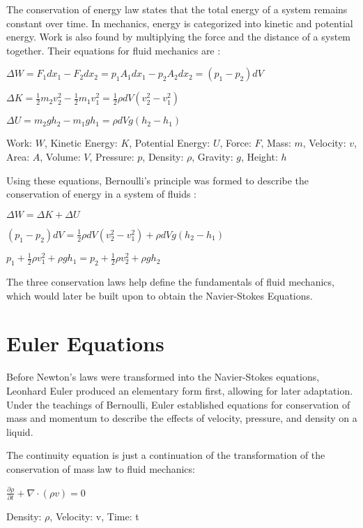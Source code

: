 \documentclass[12pt]{article}
\begin{document}
The conservation of energy law states that the total energy of a system remains constant over time. In mechanics, energy is categorized into kinetic and potential energy. Work is also found by multiplying the force and the distance of a system together. Their equations for fluid mechanics are \cite{Energy}: 
\begin{center}$\Delta W = F_1dx_1-F_2dx_2=p_1A_1dx_1-p_2A_2dx_2=(p_1-p_2)dV$\end{center}
\begin{center}$\Delta K = \frac{1}{2}m_2v_2^2-\frac{1}{2}m_1v_1^2 = \frac{1}{2}\rho dV(v_2^2-v_1^2)$\end{center}
\begin{center}$\Delta U = m_2gh_2-m_1gh_1 = \rho dVg(h_2-h_1)$\end{center}
\begin{center}Work: $W$, Kinetic Energy: $K$, Potential Energy: $U$, Force: $F$, Mass: $m$, Velocity: $v$, Area: $A$, Volume: $V$, Pressure: $p$, Density: $\rho$, Gravity: $g$, Height: $h$\end{center}

Using these equations, Bernoulli's principle was formed to describe the conservation of energy in a system of fluids \cite{Bernoulli}:
\begin{center}$\Delta W = \Delta K + \Delta U$\end{center}
\begin{center}$(p_1-p_2)dV = \frac{1}{2}\rho dV(v_2^2-v_1^2) + \rho dVg(h_2-h_1)$\end{center}
\begin{center}$p_1+\frac{1}{2}\rho v_1^2 + \rho gh_1 = p_2+\frac{1}{2}\rho v_2^2 + \rho gh_2$\end{center}

The three conservation laws help define the fundamentals of fluid mechanics, which would later be built upon to obtain the Navier-Stokes Equations.

\section{Euler Equations}
Before Newton's laws were transformed into the Navier-Stokes equations, Leonhard Euler produced an elementary form first, allowing for later adaptation. Under the teachings of Bernoulli, Euler established equations for conservation of mass and momentum to describe the effects of velocity, pressure, and density on a liquid.

The continuity equation is just a continuation of the transformation of the conservation of mass law to fluid mechanics:
\begin{center}$\frac{\partial \rho}{\partial t} + \nabla \cdot (\rho v) = 0$\end{center}
\begin{center}Density: $\rho$, Velocity: v, Time: t\end{center}
\end{document}
